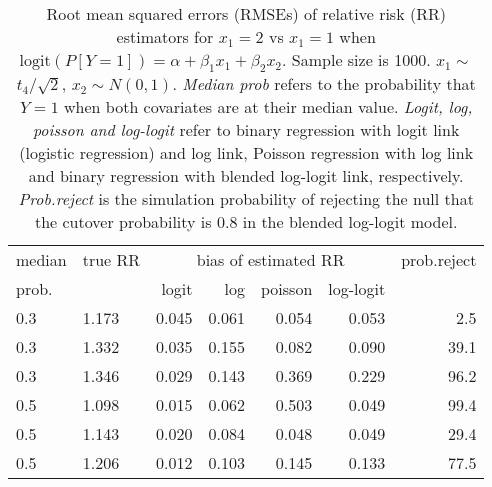 \documentclass[12pt,a4paper]{article}
\begin{document}
\begin{table}[H] 
\small\sf\centering 
\caption{Root mean squared errors (RMSEs) of relative risk (RR) estimators for $x_1=2$ vs $x_1=1$ when $\mbox{logit}(P[Y=1])=\alpha+\beta_1 x_1 + \beta_2 x_2$. Sample size is 1000. $x_1 \sim $$t_4/\sqrt{2}$, $x_2 \sim N(0,1)$. {\it Median prob} refers to the probability that $Y=1$ when both covariates are at their median value. {\it Logit, log, poisson and log-logit} refer to binary regression with logit link (logistic regression) and log link, Poisson regression with log link and binary regression with blended log-logit link, respectively. {\it Prob.reject} is the simulation probability of rejecting the null that the cutover probability is $0.8$ in the blended log-logit model.} 
\begin{tabular}{llrrrrr} 
\toprule 
median & true RR & \multicolumn{4}{c}{bias of estimated RR} & prob.reject \\ 
prob. & & logit & log & poisson & log-logit  & \\ \midrule 
0.3 & 1.173 & 0.045 & 0.061 & 0.054 & 0.053 &  2.5 \\  
0.3 & 1.332 & 0.035 & 0.155 & 0.082 & 0.090 & 39.1 \\  
0.3 & 1.346 & 0.029 & 0.143 & 0.369 & 0.229 & 96.2 \\  
0.5 & 1.098 & 0.015 & 0.062 & 0.503 & 0.049 & 99.4 \\  
0.5 & 1.143 & 0.020 & 0.084 & 0.048 & 0.049 & 29.4 \\  
0.5 & 1.206 & 0.012 & 0.103 & 0.145 & 0.133 & 77.5 \\  
\bottomrule 
\end{tabular} 
\end{table} 
\end{document}
